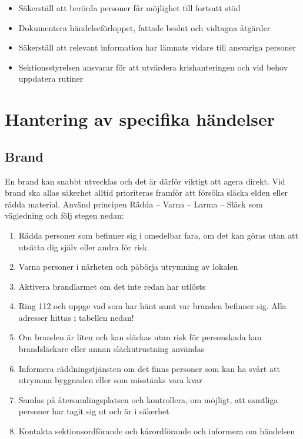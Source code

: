 \documentclass[pdfbookmarks,a4paper,11pt]{article}
\begin{document}
\begin{itemize}
    \item Säkerställ att berörda personer får möjlighet till fortsatt stöd
    \item Dokumentera händelseförloppet, fattade beslut och vidtagna åtgärder
    \item Säkerställ att relevant information har lämnats vidare till ansvariga personer
    \item Sektionsstyrelsen ansvarar för att utvärdera krishanteringen och vid behov uppdatera rutiner
\end{itemize}

\section{Hantering av specifika händelser}

\subsection{Brand}

En brand kan snabbt utvecklas och det är därför viktigt att agera direkt. Vid brand ska allas säkerhet alltid prioriteras framför att försöka släcka elden eller rädda material. Använd principen Rädda – Varna – Larma – Släck som vägledning och följ stegen nedan: 

\begin{enumerate}
    \item Rädda personer som befinner sig i omedelbar fara, om det kan göras utan att utsätta dig själv eller andra för risk
    \item Varna personer i närheten och påbörja utrymning av lokalen
    \item Aktivera brandlarmet om det inte redan har utlösts
    \item Ring 112 och uppge vad som har hänt samt var branden befinner sig. Alla adresser hittas i tabellen nedan!
    \item Om branden är liten och kan släckas utan risk för personskada kan brandsläckare eller annan släckutrustning användas
    \item Informera räddningstjänsten om det finns personer som kan ha svårt att utrymma byggnaden eller som misstänks vara kvar
    \item Samlas på återsamlingsplatsen och kontrollera, om möjligt, att samtliga personer har tagit sig ut och är i säkerhet
    \item Kontakta sektionsordförande och kårordförande och informera om händelsen
\end{enumerate}
\end{document}
